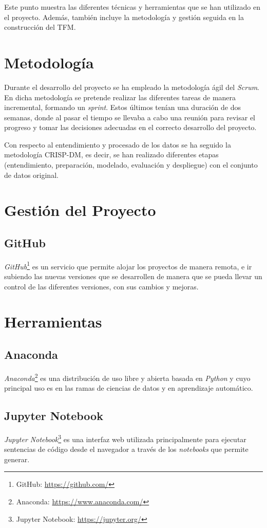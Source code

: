 
Este punto muestra las diferentes técnicas  y herramientas que se han utilizado en el proyecto. Además, también incluye la metodología y gestión seguida en la construcción del TFM.

\section{Metodología}
Durante el desarrollo del proyecto se ha empleado la metodología ágil del \emph{Scrum}. En dicha metodología se pretende realizar las diferentes tareas de manera incremental, formando un \emph{sprint}. Estos últimos tenían una duración de dos semanas, donde al pasar el tiempo se llevaba a cabo una reunión para revisar el progreso y tomar las decisiones adecuadas en el correcto desarrollo del proyecto.

Con respecto al entendimiento y procesado de los datos se ha seguido la metodología CRISP-DM, es decir, se han realizado diferentes etapas (entendimiento, preparación, modelado, evaluación y despliegue) con el conjunto de datos original.

\section{Gestión del Proyecto}
\subsection{GitHub}
\emph{GitHub}\footnote{GitHub: \url{https://github.com/}} es un servicio que permite alojar los proyectos de manera remota, e ir subiendo las nuevas versiones que se desarrollen de manera que se pueda llevar un control de las diferentes versiones, con sus cambios y mejoras.

\section{Herramientas}
\subsection{Anaconda}
\emph{Anaconda}\footnote{Anaconda: \url{https://www.anaconda.com/}} es una distribución de uso libre y abierta basada en \emph{Python} y cuyo principal uso es en las ramas de ciencias de datos y en aprendizaje automático.

\subsection{Jupyter Notebook}
\emph{Jupyter Notebook}\footnote{Jupyter Notebook: \url{https://jupyter.org/}} es una interfaz web utilizada principalmente para ejecutar sentencias de código desde el navegador a través de los \emph{notebooks} que permite generar.

